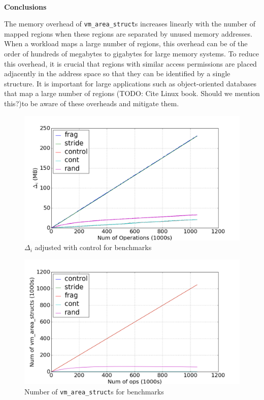 \documentclass[twocolumn,11pt]{article}
\begin{document}
~\\ \textbf{Conclusions}

The memory overhead of \texttt{vm\_area\_struct}s increases linearly with the
number of mapped regions when these regions are separated by unused memory
addresses. When a workload maps a large number of regions, this overhead can be
of the order of hundreds of megabytes to gigabytes for large memory systems.  To
reduce this overhead, it is crucial that regions with similar access permissions
are placed adjacently in the address space so that they can be identified by a
single structure. It is important for large applications such as object-oriented
databases that map a large number of regions (TODO: Cite Linux book. Should we
mention this?)to be aware of these overheads and mitigate them.

\begin{figure}[t]
    \includegraphics[width=\columnwidth]{figures/mmap_mem_usage}
    \caption{$\Delta_i$ adjusted with control for benchmarks}
    \label{fig:mmap_mem_usage}
\end{figure}

\begin{figure}[t]
    \includegraphics[width=\columnwidth]{figures/vm_area_struct_count}
    \caption{Number of \texttt{vm\_area\_struct}s for benchmarks}
    \label{fig:vm_area_struct_count}
\end{figure}
\end{document}
